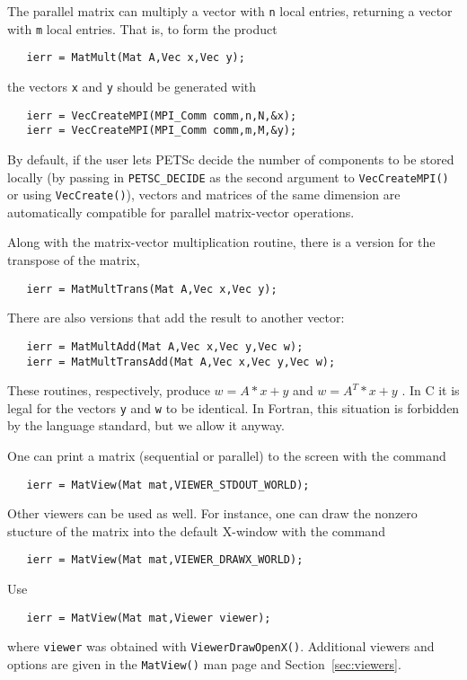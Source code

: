 The parallel matrix can multiply a vector with {\tt n} 
local entries, returning a vector with {\tt m} local entries. That is, 
to form the product 
\begin{verbatim}
   ierr = MatMult(Mat A,Vec x,Vec y);
\end{verbatim}
the vectors {\tt x} and {\tt y} should be generated with 
\begin{verbatim}
   ierr = VecCreateMPI(MPI_Comm comm,n,N,&x);
   ierr = VecCreateMPI(MPI_Comm comm,m,M,&y);
\end{verbatim}
By default, if the user lets PETSc decide the number of components to
be stored locally (by passing in {\tt PETSC\_DECIDE} as the second
argument to {\tt VecCreateMPI()} or using {\tt VecCreate()}), vectors
and matrices of the same dimension are automatically compatible for
parallel matrix-vector operations.

Along with the matrix-vector multiplication routine, there is 
a version for the transpose of the matrix, 
\begin{verbatim}
   ierr = MatMultTrans(Mat A,Vec x,Vec y);
\end{verbatim}
There are also versions that add the result
to another vector:  
\begin{verbatim}
   ierr = MatMultAdd(Mat A,Vec x,Vec y,Vec w);
   ierr = MatMultTransAdd(Mat A,Vec x,Vec y,Vec w);
\end{verbatim}
These routines, respectively, produce $ w = A*x + y $ and $ w = A^{T}*x + y$ . 
In C it is legal for the vectors {\tt y} and {\tt w} to be identical.
In Fortran, this situation is forbidden by the language standard, 
but we allow it anyway.

One can print a matrix (sequential or parallel) to the screen with the 
command 
\begin{verbatim}
   ierr = MatView(Mat mat,VIEWER_STDOUT_WORLD);
\end{verbatim}
Other viewers can be used as well. For instance, one can draw the
nonzero stucture of the matrix into the default X-window with the 
command 
\begin{verbatim}
   ierr = MatView(Mat mat,VIEWER_DRAWX_WORLD);
\end{verbatim}
Use 
\begin{verbatim}
   ierr = MatView(Mat mat,Viewer viewer);
\end{verbatim}
where {\tt viewer} was obtained with {\tt ViewerDrawOpenX()}.
Additional viewers  and options are given in the {\tt MatView()} man
page and Section~\ref{sec:viewers}.

